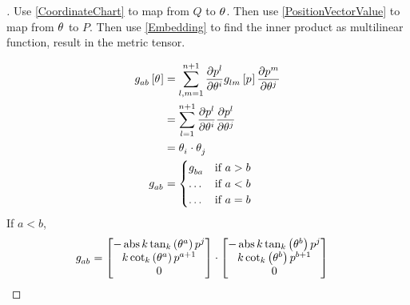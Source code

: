 \documentclass[stu, babel, american, biblatex, a4paper, leqno, draftall]{apa7}
\begin{document}
\begin{proof}[]
    \skipped

    Use \cref{CoordinateChart} to map from $Q$ to $\tensor{\theta}{}$.
    Then use \cref{PositionVectorValue} to map from $\tensor{\theta}{}$ to $P$.
    Then use \cref{Embedding} to find the inner product as multilinear function, result in the metric tensor.

    \begin{align*}
        \tensor{g}{_a_b}\left[\tensor{\theta}{}\right]
         & = \sum_{l,m=1}^{n+1}{
        \frac{\partial{\tensor{p}{^l}}}{\partial{\tensor{\theta}{^i}}}
        \tensor{g}{_l_m}\left[\tensor{p}{}\right]
        \frac{\partial{\tensor{p}{^m}}}{\partial{\tensor{\theta}{^j}}}
        }                                                \\
         & = \sum_{l=1}^{n+1}{
        \frac{\partial{\tensor{p}{^l}}}{\partial{\tensor{\theta}{^i}}}
        \frac{\partial{\tensor{p}{^l}}}{\partial{\tensor{\theta}{^j}}}
        }                                                \\
         & = \tensor{\theta}{_i}\cdot\tensor{\theta}{_j} \\
        \tensor{g}{_a_b}
         & = \begin{cases}
            \tensor{g}{_b_a} & \text{if $a>b$} \\
            \dots            & \text{if $a<b$} \\
            \dots            & \text{if $a=b$}
        \end{cases}
    \end{align*}
    If $a<b$,
    \begin{align*}
        \tensor{g}{_a_b}
         & =\begin{bmatrix}
            -\abs{k}\tan_k\left(\tensor{\theta}{^a}\right)\tensor{p}{^j} \\
            k\cot_k\left(\tensor{\theta}{^a}\right)\tensor{p}{^{a+1}}    \\
            0                                                            \\
        \end{bmatrix}\cdot\begin{bmatrix}
            -\abs{k}\tan_k\left(\tensor{\theta}{^b}\right)\tensor{p}{^j} \\
            k\cot_k\left(\tensor{\theta}{^b}\right)\tensor{p}{^{b+1}}    \\
            0                                                            \\

\end{bmatrix}
\end{align*}
\end{proof}
\end{document}
